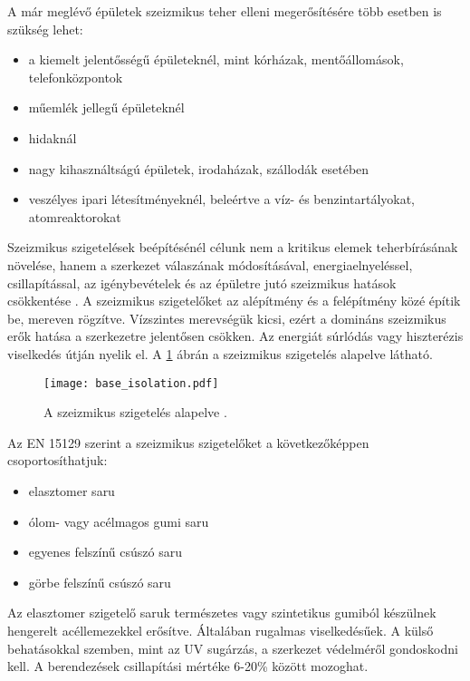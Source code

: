  A már meglévő épületek szeizmikus teher elleni megerősítésére több esetben is szükség lehet:
 \begin{itemize}
 \item a kiemelt jelentősségű épületeknél, mint kórházak, mentőállomások, telefonközpontok
 \item műemlék jellegű épületeknél
 \item hidaknál
 \item nagy kihasználtságú épületek, irodaházak, szállodák esetében
 \item veszélyes ipari létesítményeknél, beleértve a víz- és benzintartályokat, atomreaktorokat
 \end{itemize}
 


Szeizmikus szigetelések beépítésénél \cite{simon vigh}  célunk nem a kritikus elemek teherbírásának növelése, hanem a szerkezet válaszának módosításával, energiaelnyeléssel, csillapítással, az igénybevételek és az épületre jutó szeizmikus hatások csökkentése .  
A szeizmikus szigetelőket az alépítmény és a felépítmény közé építik be, mereven rögzítve. Vízszintes merevségük kicsi, ezért a domináns  szeizmikus erők hatása a szerkezetre jelentősen csökken. Az energiát súrlódás vagy hiszterézis viselkedés útján nyelik el. A \ref{fig:szig} ábrán a szeizmikus szigetelés alapelve látható.

\begin{figure}[h!]
\centering
\texttt{[image: base\_isolation.pdf]}
\caption{A szeizmikus szigetelés alapelve \cite{hibrid wiki}.}
\label{fig:szig}
\end{figure}

 

Az EN 15129 \cite{antiizé} szerint a szeizmikus szigetelőket  a következőképpen csoportosíthatjuk:
\begin{itemize}
\item elasztomer saru
\item ólom- vagy acélmagos gumi saru
\item egyenes felszínű csúszó saru
\item görbe felszínű csúszó saru
\end{itemize}

Az elasztomer szigetelő saruk természetes vagy  szintetikus gumiból készülnek hengerelt  acéllemezekkel erősítve. Általában rugalmas viselkedésűek. A külső behatásokkal szemben, mint az UV sugárzás, a szerkezet védelméről gondoskodni kell. A berendezések csillapítási mértéke 6-20\% között mozoghat. 
 
